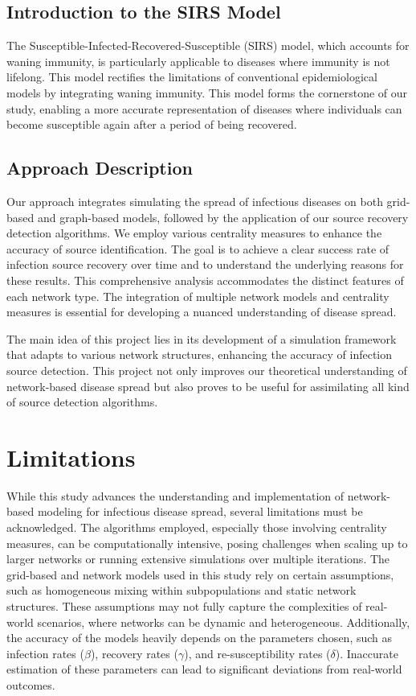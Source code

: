 \subsection{Introduction to the SIRS Model}
The Susceptible-Infected-Recovered-Susceptible (SIRS) model, which accounts for waning immunity, is particularly applicable to diseases where immunity is not lifelong. This model rectifies the limitations of conventional epidemiological models by integrating waning immunity. This model forms the cornerstone of our study, enabling a more accurate representation of diseases where individuals can become susceptible again after a period of being recovered.

\subsection{Approach Description}
Our approach integrates simulating the spread of infectious diseases on both grid-based and graph-based models, followed by the application of our source recovery detection algorithms. We employ various centrality measures to enhance the accuracy of source identification. The goal is to achieve a clear success rate of infection source recovery over time and to understand the underlying reasons for these results. This comprehensive analysis accommodates the distinct features of each network type. The integration of multiple network models and centrality measures is essential for developing a nuanced understanding of disease spread.

The main idea of this project lies in its development of a simulation framework that adapts to various network structures, enhancing the accuracy of infection source detection. This project not only improves our theoretical understanding of network-based disease spread but also proves to be useful for assimilating all kind of source detection algorithms.

\section{Limitations}
While this study advances the understanding and implementation of network-based modeling for infectious disease spread, several limitations must be acknowledged. The algorithms employed, especially those involving centrality measures, can be computationally intensive, posing challenges when scaling up to larger networks or running extensive simulations over multiple iterations. The grid-based and network models used in this study rely on certain assumptions, such as homogeneous mixing within subpopulations and static network structures. These assumptions may not fully capture the complexities of real-world scenarios, where networks can be dynamic and heterogeneous. Additionally, the accuracy of the models heavily depends on the parameters chosen, such as infection rates ($\beta$), recovery rates ($\gamma$), and re-susceptibility rates ($\delta$). Inaccurate estimation of these parameters can lead to significant deviations from real-world outcomes.

